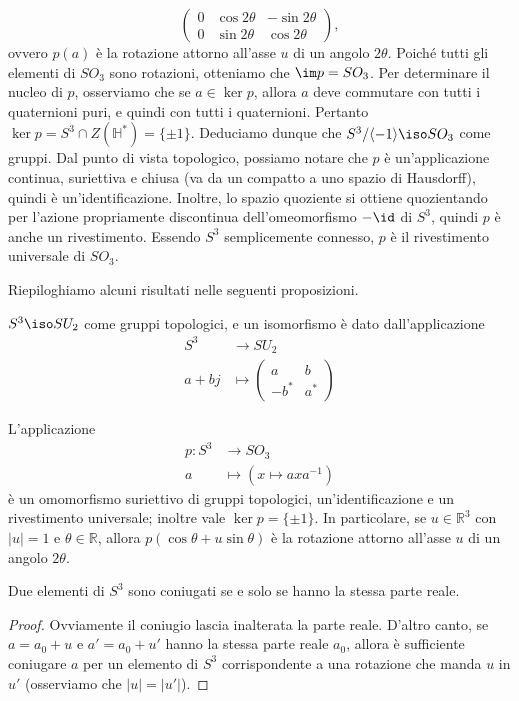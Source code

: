 \begin{itemize}
$$\begin{pmatrix}
0&\cos2\theta&-\sin2\theta\\
0&\sin2\theta&\cos2\theta
\end{pmatrix},
$$
ovvero $p(a)$ è la rotazione attorno all'asse $u$ di un angolo $2\theta$. Poiché tutti gli elementi di $SO_3$ sono rotazioni, otteniamo che $\im p=SO_3$. Per determinare il nucleo di $p$, osserviamo che se $a\in\ker p$, allora $a$ deve commutare con tutti i quaternioni puri, e quindi con tutti i quaternioni. Pertanto $\ker p=S^3\cap Z(\mathbb{H}^*)=\{\pm 1\}$. Deduciamo dunque che $S^3/\langle -1\rangle\iso SO_3$ come gruppi. Dal punto di vista topologico, possiamo notare che $p$ è un'applicazione continua, suriettiva e chiusa (va da un compatto a uno spazio di Hausdorff), quindi è un'identificazione. Inoltre, lo spazio quoziente si ottiene quozientando per l'azione propriamente discontinua dell'omeomorfismo $-\id$ di $S^3$, quindi $p$ è anche un rivestimento. Essendo $S^3$ semplicemente connesso, $p$ è il rivestimento universale di $SO_3$.
\end{itemize}

Riepiloghiamo alcuni risultati nelle seguenti proposizioni.

\begin{proposition}
$S^3\iso SU_2$ come gruppi topologici, e un isomorfismo è dato dall'applicazione
\begin{align*}
S^3&\longrightarrow SU_2\\
a+bj&\longmapsto \begin{pmatrix*}a&b\\-b^*&a^*\end{pmatrix*}
\end{align*}
\end{proposition}

\begin{proposition}
L'applicazione
\begin{align*}
p:S^3&\longrightarrow SO_3\\
a&\longmapsto(x\mapsto axa^{-1})
\end{align*}
è un omomorfismo suriettivo di gruppi topologici, un'identificazione e un rivestimento universale; inoltre vale $\ker p=\{\pm 1\}$. In particolare, se $u\in\mathbb{R}^3$ con $|u|=1$ e $\theta\in\mathbb{R}$, allora $p(\cos\theta+u\sin\theta)$ è la rotazione attorno all'asse $u$ di un angolo $2\theta$.
\end{proposition}

\begin{corollary}
Due elementi di $S^3$ sono coniugati se e solo se hanno la stessa parte reale.
\end{corollary}
\begin{proof}
Ovviamente il coniugio lascia inalterata la parte reale. D'altro canto, se $a=a_0+u$ e $a'=a_0+u'$ hanno la stessa parte reale $a_0$, allora è sufficiente coniugare $a$ per un elemento di $S^3$ corrispondente a una rotazione che manda $u$ in $u'$ (osserviamo che $|u|=|u'|$).
\end{proof}

